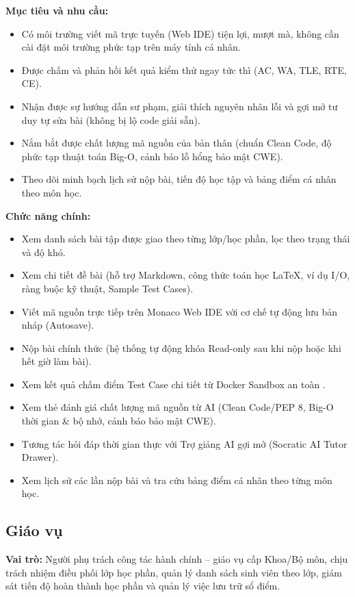 \documentclass[12pt,a4paper,oneside]{report}
\begin{document}
\noindent\textbf{Mục tiêu và nhu cầu:}
\begin{itemize}
  \item Có môi trường viết mã trực tuyến (Web IDE) tiện lợi, mượt mà, không cần cài đặt môi trường phức tạp trên máy tính cá nhân.
  \item Được chấm và phản hồi kết quả kiểm thử ngay tức thì (AC, WA, TLE, RTE, CE).
  \item Nhận được sự hướng dẫn sư phạm, giải thích nguyên nhân lỗi và gợi mở tư duy tự sửa bài (không bị lộ code giải sẵn).
  \item Nắm bắt được chất lượng mã nguồn của bản thân (chuẩn Clean Code, độ phức tạp thuật toán Big-O, cảnh báo lỗ hổng bảo mật CWE).
  \item Theo dõi minh bạch lịch sử nộp bài, tiến độ học tập và bảng điểm cá nhân theo môn học.
\end{itemize}

\noindent\textbf{Chức năng chính:}
\begin{itemize}
  \item Xem danh sách bài tập được giao theo từng lớp/học phần, lọc theo trạng thái và độ khó.
  \item Xem chi tiết đề bài (hỗ trợ Markdown, công thức toán học \LaTeX, ví dụ I/O, ràng buộc kỹ thuật, Sample Test Cases).
  \item Viết mã nguồn trực tiếp trên Monaco Web IDE với cơ chế tự động lưu bản nháp (Autosave).
  \item Nộp bài chính thức (hệ thống tự động khóa Read-only sau khi nộp hoặc khi hết giờ làm bài).
  \item Xem kết quả chấm điểm Test Case chi tiết từ Docker Sandbox an toàn \cite{kuo2023study, kuo2022study}.
  \item Xem thẻ đánh giá chất lượng mã nguồn từ AI (Clean Code/PEP 8, Big-O thời gian \& bộ nhớ, cảnh báo bảo mật CWE).
  \item Tương tác hỏi đáp thời gian thực với Trợ giảng AI gợi mở (Socratic AI Tutor Drawer).
  \item Xem lịch sử các lần nộp bài và tra cứu bảng điểm cá nhân theo từng môn học.
\end{itemize}

\subsection{Giáo vụ}
\textbf{Vai trò:} Người phụ trách công tác hành chính -- giáo vụ cấp Khoa/Bộ môn, chịu trách nhiệm điều phối lớp học phần, quản lý danh sách sinh viên theo lớp, giám sát tiến độ hoàn thành học phần và quản lý việc lưu trữ sổ điểm.
\end{document}
